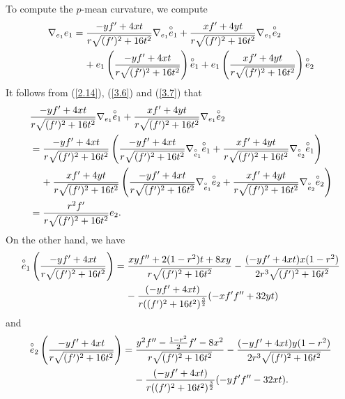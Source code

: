 \documentclass{amsart}
\theoremstyle{Corollary}
\numberwithin{equation}{section}
\begin{document}
To compute the $p$-mean curvature, we compute 
\begin{equation}\label{3.10}
\begin{split}
\nabla_{e_1}e_1
&=
\frac{-yf'+4xt}{r\sqrt{(f')^2+16t^2}}
\nabla_{e_1}\overset{\circ}{e}_1
+\frac{xf'+4yt}
{r\sqrt{(f')^2+16t^2}}\nabla_{e_1}\overset{\circ}{e}_2\\
&\hspace{4mm}+e_1\left(\frac{-yf'+4xt}{r\sqrt{(f')^2+16t^2}}\right)\overset{\circ}{e}_1
+e_1\left(\frac{xf'+4yt}
{r\sqrt{(f')^2+16t^2}}\right)\overset{\circ}{e}_2
\end{split}
\end{equation}
It follows from (\ref{2.14}), (\ref{3.6}) and (\ref{3.7}) that 
\begin{equation}\label{3.11}
\begin{split}
&\frac{-yf'+4xt}{r\sqrt{(f')^2+16t^2}}
\nabla_{e_1}\overset{\circ}{e}_1
+\frac{xf'+4yt}
{r\sqrt{(f')^2+16t^2}}\nabla_{e_1}\overset{\circ}{e}_2\\
&=\frac{-yf'+4xt}{r\sqrt{(f')^2+16t^2}}
\left(\frac{-yf'+4xt}{r\sqrt{(f')^2+16t^2}}
\nabla_{\overset{\circ}{e}_1}\overset{\circ}{e}_1
+\frac{xf'+4yt}
{r\sqrt{(f')^2+16t^2}}\nabla_{\overset{\circ}{e}_2}\overset{\circ}{e}_1\right)\\
&\hspace{4mm}
+\frac{xf'+4yt}
{r\sqrt{(f')^2+16t^2}}\left(\frac{-yf'+4xt}{r\sqrt{(f')^2+16t^2}}
\nabla_{\overset{\circ}{e}_1}\overset{\circ}{e}_2
+\frac{xf'+4yt}
{r\sqrt{(f')^2+16t^2}}\nabla_{\overset{\circ}{e}_2}\overset{\circ}{e}_2\right)\\
&=\frac{r^2f'}
{r\sqrt{(f')^2+16t^2}}e_2.
\end{split}
\end{equation}
On the other hand, we have 
\begin{equation*}
\begin{split}
\overset{\circ}{e}_1\left(\frac{-yf'+4xt}{r\sqrt{(f')^2+16t^2}}\right)
&=\frac{xyf''+2(1-r^2)t+8xy}{r\sqrt{(f')^2+16t^2}}-\frac{(-yf'+4xt)x(1-r^2)}{2r^3\sqrt{(f')^2+16t^2}}\\
&\hspace{4mm}-\frac{(-yf'+4xt)}{r((f')^2+16t^2)^{\frac{3}{2}}}(-xf'f''+32yt)
\end{split}
\end{equation*}
and 
\begin{equation*}
\begin{split}
\overset{\circ}{e}_2\left(\frac{-yf'+4xt}{r\sqrt{(f')^2+16t^2}}\right)
&=\frac{y^2f''-\frac{1-r^2}{2}f'-8x^2}{r\sqrt{(f')^2+16t^2}}-\frac{(-yf'+4xt)y(1-r^2)}{2r^3\sqrt{(f')^2+16t^2}}\\
&\hspace{4mm}-\frac{(-yf'+4xt)}{r((f')^2+16t^2)^{\frac{3}{2}}}(-yf'f''-32xt).
\end{split}
\end{equation*}
\end{document}
